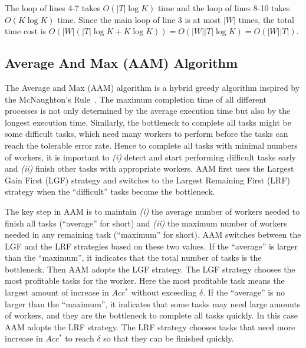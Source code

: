 The loop of lines 4-7 takes $O(|T|\log{K})$ time and the loop of lines 8-10 takes $O(K\log{K})$ time.
Since the main loop of line 3 is at most $|W|$ times, the total time cost is $O(|W|(|T|\log{K} + K\log{K})) = O(|W||T|\log{K}) = O(|W||T|)$.

\subsection{Average And Max (AAM) Algorithm}
The Average and Max (AAM) algorithm is a hybrid greedy algorithm inspired by the McNaughton's Rule~\cite{NaughtonRule}.
The maximum completion time of all different processes is not only determined by the average execution time but also by the longest execution time.
Similarly, the bottleneck to complete all tasks might be some difficult tasks, which need many workers to perform before the tasks can reach the tolerable error rate.
Hence to complete all tasks with minimal numbers of workers, it is important to \textit{(i)} detect and start performing difficult tasks early and \textit{(ii)} finish other tasks with appropriate workers.
AAM first uses the Largest Gain First (LGF) strategy and switches to the Largest Remaining First (LRF) strategy when the ``difficult'' tasks become the bottleneck.


The key step in AAM is to maintain \textit{(i)} the average number of workers needed to finish all tasks (``average'' for short) and \textit{(ii)} the maximum number of workers needed in any remaining task (``maximum'' for short).
AAM switches between the LGF and the LRF strategies based on these two values.
If the ``average'' is larger than the ``maximum'', it indicates that the total number of tasks is the bottleneck.
Then AAM adopts the LGF strategy. 
The LGF strategy chooses the most profitable tasks for the worker.
Here the most profitable task means the largest amount of increase in $Acc^{*}$ without exceeding $\delta$.
If the ``average'' is no larger than the ``maximum'', it indicates that some tasks may need large amounts of workers, and they are the bottleneck to complete all tasks quickly.
In this case AAM adopts the LRF strategy.
The LRF strategy chooses tasks that need more increase in $Acc^{*}$ to reach $\delta$ so that they can be finished quickly.


